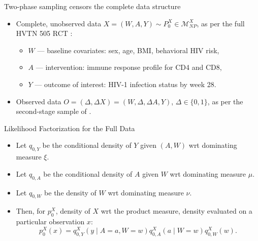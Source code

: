 \documentclass{beamer}
\begin{document}
\begin{frame}[c]{Two-phase sampling censors the complete data structure}

\begin{center}
\begin{itemize}
  \itemsep10pt
  \item Complete, unobserved data $X = (W, A, Y) \sim P_0^X \in
    \mathcal{M}^X_{NP}$, as per the full HVTN 505 RCT
    \citep{hammer2013efficacy}:
    \vspace{1em}
    \begin{itemize}
      \itemsep8pt
      \item $W$ --- baseline covariates: sex, age, BMI, behavioral HIV risk,
      \item $A$ --- intervention: immune response profile for CD4 and CD8,
      \item $Y$ --- outcome of interest: HIV-1 infection status by week 28.
    \end{itemize}
  \item Observed data $O = (\Delta, \Delta X) = (W, \Delta, \Delta A, Y)$,
    $\Delta \in \{0,1\}$, as per the second-stage sample of
    \cite{janes2017higher}.
\end{itemize}
\end{center}


\end{frame}


\begin{frame}[c]{Likelihood Factorization for the Full Data}

\begin{center}
\begin{itemize}
  \itemsep10pt
  \item Let $q_{0, Y}$ be the conditional density of $Y$ given $(A, W)$ wrt
    dominating measure $\xi$.
  \item Let $q_{0, A}$ be the conditional density of $A$ given $W$ wrt
    dominating measure $\mu$.
  \item Let $q_{0, W}$ be the density of $W$ wrt dominating measure $\nu$.
  \item Then, for $p_0^X$, density of $X$ wrt the product measure, density
    evaluated on a particular observation $x$:
    \begin{equation*}\label{likelihood_factorization}
       p_0^X(x) = q^X_{0,Y}(y \mid A = a, W = w) q^X_{0,A}(a \mid W = w)
        q^X_{0,W}(w).
     \end{equation*}
\end{itemize}
\end{center}

\note{
}

\end{frame}
\end{document}
